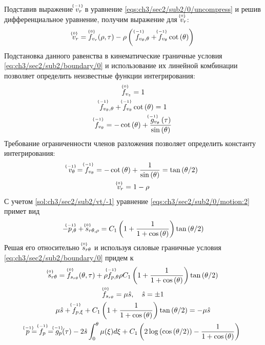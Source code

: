 Подставив выражение $\uindex{v}{-1}_{r}$ в уравнение \cref{eqs:ch3/sec2/sub2/0/uncompress} и решив дифференциальное уравнение, получим выражение для $\uindex{v}{0}_{r}$:
\begin{equation*}
  \uindex{v}{0}_{r} = \uindex{f}{0}_{v_{r}}(\rho, \tau) -\rho \left(\ \uindex{f}{-1}_{v_{\theta},\theta} + \uindex{f}{-1}_{v_{\theta}} \cot{\left(\theta\right)}\right)
\end{equation*}
Подстановка данного равенства в кинематические граничные условия \cref{eq:ch3/sec2/sub2/boundary/0} и использование их линейной комбинации позволяет определить неизвестные функции интегрирования:
\begin{gather*}
  \uindex{f}{0}_{v_{z}} = 1
  \\
  \uindex{f}{-1}_{v_{\theta},\theta} + \uindex{f}{-1}_{v_{\theta}} \cot{\left(\theta\right)} = 1
  \\
  \uindex{f}{-1}_{v_{\theta}} = -\cot{\left(\theta\right)} + \frac{\uindex{g}{-1}_{v_{\theta}}\left(\tau\right)}{\sin{\left(\theta\right)}}
\end{gather*}
Требование ограниченности членов разложения позволяет определить константу интегрирования:
\begin{gather}
  \label{sol:ch3/sec2/sub2/vt/-1}
  \uindex{v}{-1}_{\theta} = \uindex{f}{-1}_{v_{\theta}} = -\cot{\left(\theta\right)} + \frac{1}{\sin{\left(\theta\right)}} = \tan{\left({\theta / 2}\right)}
  \\
  \label{sol:ch3/sec2/sub2/vr/0}
  \uindex{v}{0}_{r} =  1-\rho
\end{gather}
С учетом \cref{sol:ch3/sec2/sub2/vt/-1} уравнение \cref{eqs:ch3/sec2/sub2/0/motion:2} примет вид
\begin{equation*}
  -\uindex{p}{-1}_{,\theta} + \uindex{s}{0}_{r\theta,\rho} = C_1 \left(1+\frac{1}{1+\cos{\left(\theta\right)}}\right) \tan{\left({\theta / 2}\right)}
\end{equation*}
Решая его относительно $\uindex{s}{0}_{r\theta}$ и используя силовые граничные условия \cref{eq:ch3/sec2/sub2/boundary/0} придем к
\begin{gather*}
  \uindex{s}{0}_{r\theta} = \uindex{f}{0}_{s_{r\theta}}(\theta, \tau) + \rho  \uindex{f}{-1}_{p,\theta} \rho C_1 \left(1+\frac{1}{1+\cos{\left(\theta\right)}}\right) \tan{\left({\theta / 2}\right)}
  \\
  \uindex{f}{0}_{s_{r\theta}} = \mu\hat{s}, \quad \hat{s} = \pm 1
  \\
  \mu\hat{s} + \uindex{f}{-1}_{p,\xi} + C_1 \left(1+\frac{1}{1+\cos{\left(\theta\right)}}\right) \tan{\left({\theta / 2}\right)}= -\mu \hat{s}
  \\
  \uindex{p}{-1}=\uindex{f}{-1}_{p} =\uindex{g}{-1}_{p}(\tau) -2\hat{s}\int_0^{\theta}{\mu(\xi)d\xi} + C_1 \left(2\log{\left(\cos{\left({\theta / 2}\right)}\right)} - \frac{1}{1+\cos{\left(\theta\right)}}\right)
\end{gather*}
